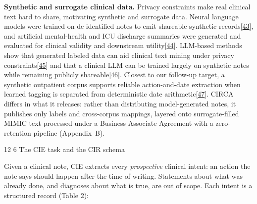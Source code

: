 \documentclass[3p,twocolumn]{elsarticle}
\makeatletter
\renewcommand\section{\@startsection {section}{1}{\z@}%
    {12\p@ \@plus 4\p@ \@minus 4\p@}%
    {6\p@ \@plus 4\p@ \@minus 3\p@}%
    {\normalsize\bfseries\boldmath}}
\makeatother
\begin{document}
\textbf{Synthetic and surrogate clinical data.} Privacy constraints make real clinical text hard to share, motivating synthetic and surrogate data. Neural language models were trained on de-identified notes to emit shareable synthetic records{[}\hyperref[r43]{43}{]}, and artificial mental-health and ICU discharge summaries were generated and evaluated for clinical validity and downstream utility{[}\hyperref[r44]{44}{]}. LLM-based methods show that generated labeled data can aid clinical text mining under privacy constraints{[}\hyperref[r45]{45}{]} and that a clinical LLM can be trained largely on synthetic notes while remaining publicly shareable{[}\hyperref[r46]{46}{]}. Closest to our follow-up target, a synthetic outpatient corpus supports reliable action-and-date extraction when learned tagging is separated from deterministic date arithmetic{[}\hyperref[r47]{47}{]}. CIRCA differs in what it releases: rather than distributing model-generated notes, it publishes only labels and cross-corpus mappings, layered onto surrogate-filled MIMIC text processed under a Business Associate Agreement with a zero-retention pipeline (Appendix~B).

\section{The CIE task and the CIR schema}\label{the-cie-task-and-the-cir-schema}

Given a clinical note, CIE extracts every \emph{prospective} clinical intent: an action the note says should happen after the time of writing. Statements about what was already done, and diagnoses about what is true, are out of scope. Each intent is a structured record (Table 2):
\end{document}
